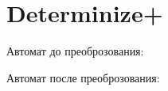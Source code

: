 \section{Determinize+}
\begin{frame}{}
	Автомат до преоброзования:


	Автомат после преоброзования:

\end{frame}
